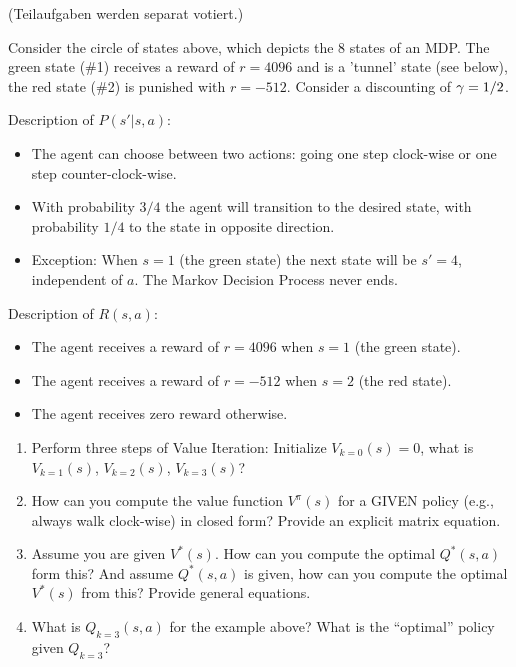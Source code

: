 

\renewcommand{\course}{Artificial Intelligence}
\renewcommand{\coursepicture}{course_ai}
\renewcommand{\coursedate}{Winter 2019}
\renewcommand{\exnum}{Exercise 3}

\exercises
{}
\exercisestitle



(Teilaufgaben werden separat votiert.)


Consider the circle of states above, which depicts the 8 states of an
MDP. The green state (\#1) receives a reward of $r=4096$ and is a 'tunnel'
state (see below), the red state (\#2) is punished with
$r=-512$. Consider a discounting of $\gamma=1/2$.

Description of $P(s'|s,a)$:\NewParNoBreak
\begin{itemize}
\item The agent can choose between two actions: going one step clock-wise or one
  step counter-clock-wise.
\item With probability $3/4$ the agent will transition to the desired state,
  with probability $1/4$ to the state in opposite direction.
\item Exception: When $s=1$ (the green state) the next state will be
$s'=4$, independent of $a$. The Markov Decision Process never ends.
\end{itemize}

Description of $R(s,a)$:\NewParNoBreak
\begin{itemize}
\item The agent receives a reward of $r=4096$ when $s=1$ (the green state).
\item The agent receives a reward of $r=-512$ when $s=2$ (the red
state).
\item The agent receives zero reward otherwise.
\end{itemize}

\begin{enumerate}
\item Perform three steps of Value Iteration: Initialize $V_{k=0}(s)=0$, what is
  $V_{k=1}(s)$, $V_{k=2}(s)$, $V_{k=3}(s)$?
\item How can you compute the value function $V^\pi(s)$ for
a GIVEN policy (e.g., always walk clock-wise) in closed form? Provide
an explicit matrix equation.
\item Assume you are given $V^*(s)$. How can you compute the optimal $Q^*(s,a)$
  form this? And assume $Q^*(s,a)$ is given, how can you compute the optimal
  $V^*(s)$ from this? Provide general equations.
\item What is $Q_{k=3}(s,a)$ for the example above? What is the
  ``optimal'' policy given $Q_{k=3}$?
\end{enumerate}

